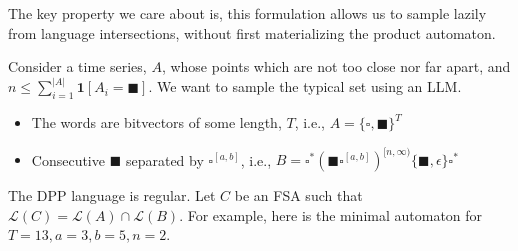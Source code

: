\documentclass[portrait,a0b,final,a4resizeable]{a0poster}
\def\jointspacing{\vspace{0.3in}}
\newcommand{\bs}{\blacksquare}
\newcommand{\ws}{\square}
\begin{document}
\begin{poster}
\begin{multicols}{2}
    \hspace*{2cm}\begin{minipage}[c]{0.90\columnwidth}
    The key property we care about is, this formulation allows us to sample lazily from language intersections, without first materializing the product automaton.
    \end{minipage}

    \jointspacing


      \jointspacing

      \hspace*{2cm}\begin{minipage}[c]{0.90\columnwidth}
      Consider a time series, $A$, whose points which are not too close nor far apart, and $n \leq \sum_{i=1}^{|A|} \mathbf{1}[A_i = \bs]$. We want to sample the typical set using an LLM.\vspace{0.5cm}
\begin{itemize}[leftmargin=2cm]
\item The words are bitvectors of some length, $T$, i.e., $A = \{\ws, \bs\}^T$
\item Consecutive $\bs$ separated by $\ws^{[a,b]}$, i.e., $B = \ws^*(\bs\ws^{[a, b]})^{[n,\infty)}\{\bs,\epsilon\}\ws^*$
\end{itemize}\vspace{0.5cm}

The DPP language is regular. Let $C$ be an FSA such that $\mathcal{L}(C) = \mathcal{L}(A) \cap \mathcal{L}(B)$. For example, here is the minimal automaton for $T=13, a=3, b=5, n=2$.
      \end{minipage}

\jointspacing

\hspace{5cm}

\jointspacing


\end{multicols}
\end{poster}
\end{document}
